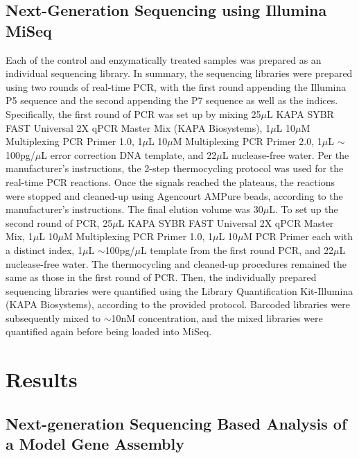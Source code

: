 \documentclass[letterpaper,12pt]{article}
\begin{document}
\subsection*{Next-Generation Sequencing using Illumina MiSeq}
Each of the control and enzymatically treated samples was prepared as an individual sequencing library. In summary, the sequencing libraries were prepared using two rounds of real-time PCR, with the first round appending the Illumina P5 sequence and the second appending the P7 sequence as well as the indices. Specifically, the first round of PCR was set up by mixing 25$\mu$L KAPA SYBR FAST Universal 2X qPCR Master Mix (KAPA Biosystems), 1$\mu$L 10$\mu$M Multiplexing PCR Primer 1.0, 1$\mu$L 10$\mu$M Multiplexing PCR Primer 2.0, 1$\mu$L $\sim$100pg/$\mu$L error correction DNA template, and 22$\mu$L nuclease-free water. Per the manufacturer’s instructions, the 2-step thermocycling protocol was used for the real-time PCR reactions. Once the signals reached the plateaus, the reactions were stopped and cleaned-up using Agencourt AMPure beads, according to the manufacturer’s instructions. The final elution volume was 30$\mu$L. To set up the second round of PCR, 25$\mu$L KAPA SYBR FAST Universal 2X qPCR Master Mix, 1$\mu$L 10$\mu$M Multiplexing PCR Primer 1.0, 1$\mu$L 10$\mu$M PCR Primer each with a distinct index, 1$\mu$L $\sim$100pg/$\mu$L template from the first round PCR, and 22$\mu$L nuclease-free water. The thermocycling and cleaned-up procedures remained the same as those in the first round of PCR. Then, the individually prepared sequencing libraries were quantified using the Library Quantification Kit-Illumina (KAPA Biosystems), according to the provided protocol. Barcoded libraries were subsequently mixed to $\sim$10nM concentration, and the mixed libraries were quantified again before being loaded into MiSeq.

%
\section*{Results}
%

\subsection*{Next-generation Sequencing Based Analysis of a Model Gene Assembly}
\end{document}
